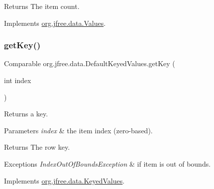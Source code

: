 \begin{DoxyReturn}{Returns}
The item count. 
\end{DoxyReturn}


Implements \mbox{\hyperlink{interfaceorg_1_1jfree_1_1data_1_1_values_afd00781dbc2e351b7a77aca9a91ca0a9}{org.\+jfree.\+data.\+Values}}.

\mbox{\label{classorg_1_1jfree_1_1data_1_1_default_keyed_values_adde9e3ec6af9e5fbbf0406f056204b51}} 
\subsubsection{\texorpdfstring{get\+Key()}{getKey()}}
{\footnotesize\ttfamily Comparable org.\+jfree.\+data.\+Default\+Keyed\+Values.\+get\+Key (\begin{DoxyParamCaption}\item[{int}]{index }\end{DoxyParamCaption})}

Returns a key.


\begin{DoxyParams}{Parameters}
{\em index} & the item index (zero-\/based).\\
\hline
\end{DoxyParams}
\begin{DoxyReturn}{Returns}
The row key.
\end{DoxyReturn}

\begin{DoxyExceptions}{Exceptions}
{\em Index\+Out\+Of\+Bounds\+Exception} & if {\ttfamily item} is out of bounds. \\
\hline
\end{DoxyExceptions}


Implements \mbox{\hyperlink{interfaceorg_1_1jfree_1_1data_1_1_keyed_values_a830386de8513342d99845bbd9cb57bc4}{org.\+jfree.\+data.\+Keyed\+Values}}.

\mbox{\label{classorg_1_1jfree_1_1data_1_1_default_keyed_values_ad6896bc409fc73cbdf59a50ac427d261}} 

